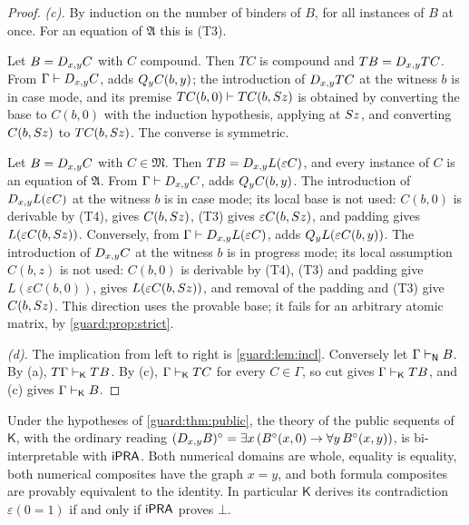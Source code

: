 \begin{proof}
\emph{(c).}  By induction on the number of binders of $B$, for all
instances of $B$ at once.  For an equation of $\mathfrak A$ this is (T3).

Let $B=D_{x,y}C$ with $C$ compound.  Then $TC$ is compound and
$TB=D_{x,y}TC$.  From $\Gamma\vdash D_{x,y}C$,  adds
$Q_{y}C(b,y)$; the introduction of $D_{x,y}TC$ at the witness $b$ is in
case mode, and its premise $TC(b,0)\vdash TC(b,S z)$ is obtained by
converting the base to $C(b,0)$ with the induction hypothesis, applying
 at $S z$, and converting $C(b,S z)$ to $TC(b,S z)$.
The converse is symmetric.

Let $B=D_{x,y}C$ with $C\in\mathfrak M$.  Then $TB=D_{x,y}L(\varepsilon
C)$, and every instance of $C$ is an equation of $\mathfrak A$.  From
$\Gamma\vdash D_{x,y}C$,  adds $Q_{y}C(b,y)$.  The
introduction of $D_{x,y}L(\varepsilon C)$ at the witness $b$ is in case
mode; its local base is not used: $C(b,0)$ is derivable by (T4),
 gives $C(b,S z)$, (T3) gives $\varepsilon C(b,S z)$,
and padding gives $L(\varepsilon C(b,S z))$.  Conversely, from
$\Gamma\vdash D_{x,y}L(\varepsilon C)$,  adds
$Q_{y}L(\varepsilon C(b,y))$.  The introduction of $D_{x,y}C$ at the
witness $b$ is in progress mode; its local assumption $C(b,z)$ is not used:
$C(b,0)$ is derivable by (T4), (T3) and padding give
$L(\varepsilon C(b,0))$,  gives $L(\varepsilon C(b,S z))$,
and removal of the padding and (T3) give $C(b,S z)$.  This direction uses
the provable base; it fails for an arbitrary atomic matrix, by
\cref{guard:prop:strict}.

\emph{(d).}  The implication from left to right is \cref{guard:lem:incl}.
Conversely let $\Gamma\vdash_{\mathsf{N}}B$.  By (a),
$T\Gamma\vdash_{\mathsf K}TB$.  By (c), $\Gamma\vdash_{\mathsf K}TC$ for
every $C\in\Gamma$, so cut gives $\Gamma\vdash_{\mathsf K}TB$, and (c)
gives $\Gamma\vdash_{\mathsf K}B$.
\end{proof}

\begin{corollary}[Bi-interpretation]
\label{guard:cor:biinterp}
Under the hypotheses of \cref{guard:thm:public}, the theory of the public
sequents of $\mathsf K$, with the ordinary reading
$(D_{x,y}B)^\circ=\exists x\,(B^\circ(x,0)\to\forall y\,B^\circ(x,y))$, is
bi-interpretable with $\mathsf{iPRA}$.  Both numerical domains are whole, equality
is equality, both numerical composites have the graph $x=y$, and both
formula composites are provably equivalent to the identity.  In particular
$\mathsf K$ derives its contradiction $\varepsilon(0=1)$ if and only if
$\mathsf{iPRA}$ proves $\bot$.
\end{corollary}


